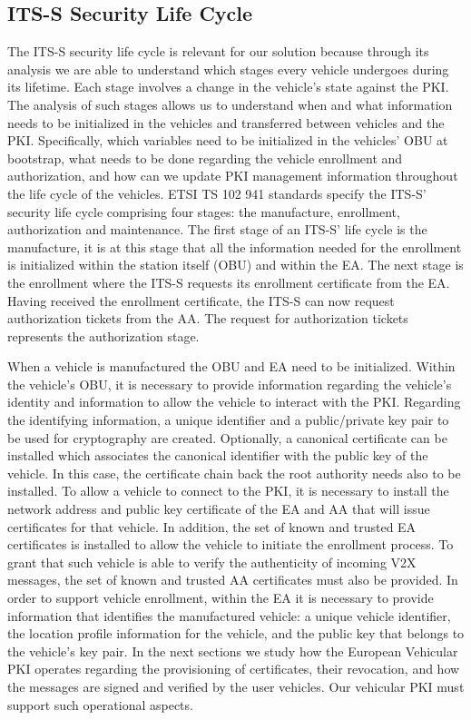 \subsection{ITS-S Security Life Cycle}
\label{section:life-cycle}

The ITS-S security life cycle is relevant for our solution because through its analysis we are able to understand which stages every vehicle undergoes during its lifetime. Each stage involves a change in the vehicle's state against the PKI. The analysis of such stages allows us to understand when and what information needs to be initialized in the vehicles and transferred between vehicles and the PKI. Specifically, which variables need to be initialized in the vehicles’ OBU at bootstrap, what needs to be done regarding the vehicle enrollment and authorization, and how can we update PKI management information throughout the life cycle of the vehicles.
ETSI TS 102 941 \cite{etsi_privacy} standards specify the ITS-S' security life cycle comprising four stages: the manufacture, enrollment, authorization and maintenance. The first stage of an ITS-S' life cycle is the manufacture, it is at this stage that all the information needed for the enrollment is initialized within the station itself (OBU) and within the EA. The next stage is the enrollment where the ITS-S requests its enrollment certificate from the EA. Having received the enrollment certificate, the ITS-S can now request authorization tickets from the AA. The request for authorization tickets represents the authorization stage. 

When a vehicle is manufactured the OBU and EA need to be initialized. Within the vehicle's OBU, it is necessary to provide information regarding the vehicle's identity and information to allow the vehicle to interact with the PKI. Regarding the identifying information, a unique identifier and a public\slash private key pair to be used for cryptography are created. Optionally, a canonical certificate can be installed which associates the canonical identifier with the public key of the vehicle. In this case, the certificate chain back the root authority needs also to be installed. To allow a vehicle to connect to the PKI, it is necessary to install the network address and public key certificate of the EA and AA that will issue certificates for that vehicle. In addition, the set of known and trusted EA certificates is installed to allow the vehicle to initiate the enrollment process. To grant that such vehicle is able to verify the authenticity of incoming V2X messages, the set of known and trusted AA certificates must also be provided. In order to support vehicle enrollment, within the EA it is necessary to provide information that identifies the manufactured vehicle: a unique vehicle identifier, the location profile information for the vehicle, and the public key that belongs to the vehicle's key pair. In the next sections we study how the European Vehicular PKI operates regarding the provisioning of certificates, their revocation, and how the messages are signed and verified by the user vehicles. Our vehicular PKI must support such operational aspects.

